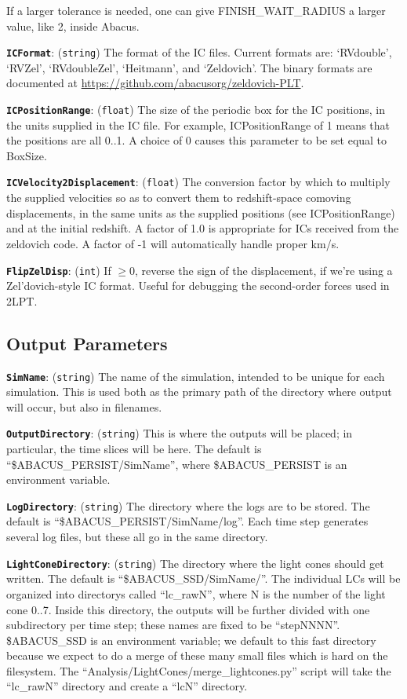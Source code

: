 \documentclass[11pt,preprint]{aastex}
\newcommand{\param}[2]{\medskip\noindent\textbf{\texttt{#1}}: ({\tt #2}) }
\begin{document}
If a larger tolerance is needed, one can give FINISH\_WAIT\_RADIUS a larger value, like 2, inside Abacus.

\param{ICFormat}{string} The format of the IC files.  Current formats
are: `RVdouble', `RVZel', `RVdoubleZel', `Heitmann', and `Zeldovich'.
The binary formats are documented at \url{https://github.com/abacusorg/zeldovich-PLT}.

\param{ICPositionRange}{float} The size of the periodic box for the 
IC positions, in the units supplied in the IC file.  For example, 
ICPositionRange of 1 means that the positions are all 0..1.  A choice
of 0 causes this parameter to be set equal to BoxSize.

\param{ICVelocity2Displacement}{float} The conversion factor by which
to multiply the supplied velocities so as to convert them to redshift-space
comoving displacements, in the same units as the supplied positions (see
ICPositionRange) and at the initial redshift.  A factor of 1.0 is appropriate
for ICs received from the zeldovich code.  A factor of -1 will automatically
handle proper km/s.

\param{FlipZelDisp}{int} If $\ge0$, reverse the sign of the displacement, if we're using a Zel'dovich-style IC format.
Useful for debugging the second-order forces used in 2LPT.

\subsection{Output Parameters}

\param{SimName}{string} The name of the simulation, intended to be unique
for each simulation.  This is used both as the primary path of the directory
where output will occur, but also in filenames.

\param{OutputDirectory}{string} This is where the outputs will be
placed; in particular, the time slices will be here.  The default is
``\$ABACUS\_PERSIST/SimName'', where \$ABACUS\_PERSIST is an environment variable.

\param{LogDirectory}{string} The directory where the logs are to be
stored.  The default is ``\$ABACUS\_PERSIST/SimName/log''.  Each time step
generates several log files, but these all go in the same directory.

\param{LightConeDirectory}{string} The directory where the light
cones should get written.  The default is ``\$ABACUS\_SSD/SimName/''.
The individual LCs will be organized into directorys called ``lc\_rawN'', where N is the number
of the light cone 0..7.
Inside this directory, the outputs will be further divided with one 
subdirectory per time step; these names are fixed to be ``stepNNNN''.
\$ABACUS\_SSD is an environment variable; we default to this fast
directory because we expect to do a merge of these many small files which is hard on the filesystem.
The ``Analysis/LightCones/merge\_lightcones.py'' script will take the
``lc\_rawN'' directory and create a ``lcN'' directory.
\end{document}
